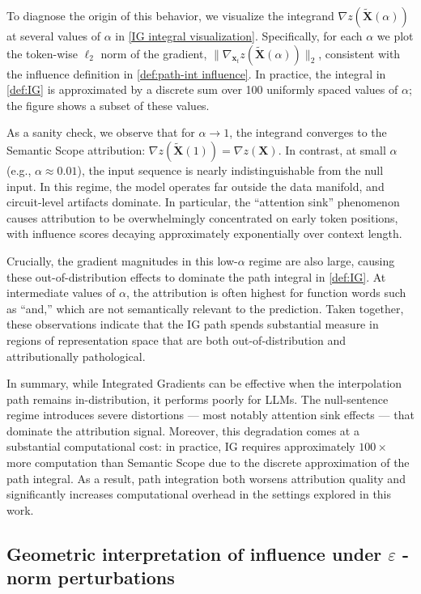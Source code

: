 \documentclass{article}
\begin{document}
To diagnose the origin of this behavior, we visualize the integrand $\nabla z(\bm{\tilde X}(\alpha))$ at several values of $\alpha$ in \cref{IG integral visualization}.
Specifically, for each $\alpha$ we plot the token-wise $\ell_2$ norm of the gradient, $\|\nabla_{\bm{x}_t} z(\bm{\tilde X}(\alpha))\|_2$, consistent with the influence definition in \cref{def:path-int influence}.
In practice, the integral in \cref{def:IG} is approximated by a discrete sum over 100 uniformly spaced values of $\alpha$; the figure shows a subset of these values.

As a sanity check, we observe that for $\alpha \to 1$, the integrand converges to the Semantic Scope attribution:
$\nabla z(\bm{\tilde X}(1)) = \nabla z(\bm{X})$.
In contrast, at small $\alpha$ (e.g., $\alpha \approx 0.01$), the input sequence is nearly indistinguishable from the null input.
In this regime, the model operates far outside the data manifold, and circuit-level artifacts dominate.
In particular, the ``attention sink'' phenomenon \cite{Xiao-attention-sink-2024} causes attribution to be overwhelmingly concentrated on early token positions, with influence scores decaying approximately exponentially over context length.

Crucially, the gradient magnitudes in this low-$\alpha$ regime are also large, causing these out-of-distribution effects to dominate the path integral in \cref{def:IG}.
At intermediate values of $\alpha$, the attribution is often highest for function words such as ``and,'' which are not semantically relevant to the prediction.
Taken together, these observations indicate that the IG path spends substantial measure in regions of representation space that are both out-of-distribution and attributionally pathological.

In summary, while Integrated Gradients can be effective when the interpolation path remains in-distribution, it performs poorly for LLMs.
The null-sentence regime introduces severe distortions — most notably attention sink effects — that dominate the attribution signal.
Moreover, this degradation comes at a substantial computational cost: in practice, IG requires approximately $100\times$ more computation than Semantic Scope due to the discrete approximation of the path integral.
As a result, path integration both worsens attribution quality and significantly increases computational overhead in the settings explored in this work.

\subsection{Geometric interpretation of influence under \texorpdfstring{$\varepsilon$}{ep}
-norm perturbations}
\label{app:epsilon_perturbation}
\end{document}
